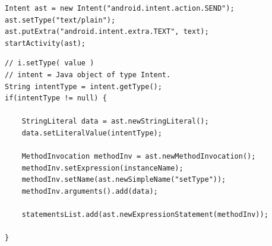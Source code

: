 {\footnotesize\begin{lstlisting}[label=generatedCode,caption=Generated code of an Intent]
Intent ast = new Intent("android.intent.action.SEND");
ast.setType("text/plain");
ast.putExtra("android.intent.extra.TEXT", text);
startActivity(ast);		
\end{lstlisting}}

{\footnotesize\begin{lstlisting}[label=astjavacodesettype,caption=Java code to set type property]
// i.setType( value )
// intent = Java object of type Intent.
String intentType = intent.getType();
if(intentType != null) {

	StringLiteral data = ast.newStringLiteral();
	data.setLiteralValue(intentType);
	
	MethodInvocation methodInv = ast.newMethodInvocation();
	methodInv.setExpression(instanceName);
	methodInv.setName(ast.newSimpleName("setType"));
	methodInv.arguments().add(data);
	
	statementsList.add(ast.newExpressionStatement(methodInv));
	
}		
\end{lstlisting}}